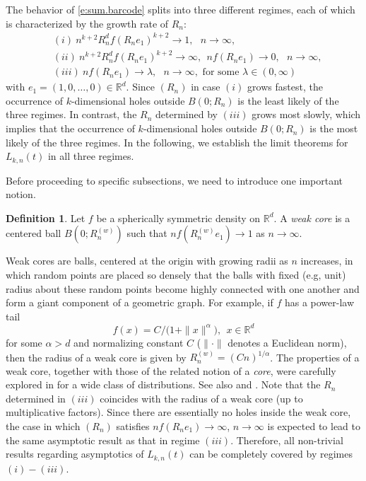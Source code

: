 \documentclass[11pt]{amsart}
\numberwithin{equation}{section}
\theoremstyle{plain}
\theoremstyle{definition}
\newtheorem{definition}[theorem]{Definition}
\begin{document}
The behavior of \eqref{e:sum.barcode} splits into three different regimes, each of which is characterized by the growth rate of $R_n$:
\begin{align*}
&(i) \ n^{k+2}R_n^d f(R_ne_1)^{k+2} \to 1, \ \ \ n\to\infty, \\
&(ii) \  n^{k+2}R_n^d f(R_ne_1)^{k+2} \to \infty,   \ \ nf(R_ne_1) \to 0, \ \ \ n\to\infty,  \\
&(iii) \ nf(R_ne_1) \to \lambda, \ \  \ n\to\infty, \text{ for some } \lambda \in (0,\infty)
\end{align*}
with $e_1 = (1,0,\dots,0) \in {{\mathbb R}}^d$.
Since $(R_n)$ in case $(i)$ grows fastest, the occurrence of $k$-dimensional holes outside $B(0; R_n)$ is the least likely of the three regimes. In contrast, the $R_n$ determined by $(iii)$ grows most slowly, which implies that the occurrence of $k$-dimensional holes outside $B(0; R_n)$ is the most likely of the three regimes. In the following, we establish the limit theorems for $L_{k,n}(t)$ in all three regimes.

Before proceeding to specific subsections, we need to introduce one important notion.
\begin{definition}  \label{def.weak.core}
Let $f$ be a spherically symmetric density on ${{\mathbb R}}^d$. A \textit{weak core} is a centered ball
$B(0; R_n^{(w)})$ such that $nf(R_n^{(w)}e_1) \to 1$ as $n \to
\infty$.
\end{definition}

Weak cores are balls, centered at the origin with growing radii as $n$ increases, in which random points are placed so densely that the balls with fixed (e.g, unit) radius about these random points become highly connected with one another and form a giant component of a geometric graph. For example, if $f$ has a power-law tail
$$
f(x) =  C/\bigl( 1+\| x \|^\alpha \bigr), \ \ x \in {{\mathbb R}}^d
$$
for some $\alpha > d$ and normalizing constant $C$ ($\| \cdot \|$ denotes a Euclidean norm), then the radius of a weak core is given by $R_n^{(w)} = (Cn)^{1/\alpha}$. The properties of a weak core, together with those of the related notion of a \textit{core}, were carefully explored in \cite{owada:2016} for a wide class of distributions. See also \cite{owada:adler:2016} and \cite{adler:bobrowski:weinberger:2014}. Note that the $R_n$ determined in $(iii)$ coincides with the radius of a weak core (up to multiplicative factors). Since there are essentially no holes inside the weak core, the case in which $(R_n)$ satisfies $nf(R_ne_1) \to \infty$, $n \to \infty$ is expected to lead to the same asymptotic result as that in regime $(iii)$. Therefore, all non-trivial results regarding asymptotics of $L_{k,n}(t)$ can be completely covered by regimes $(i) - (iii)$. 
\end{document}
